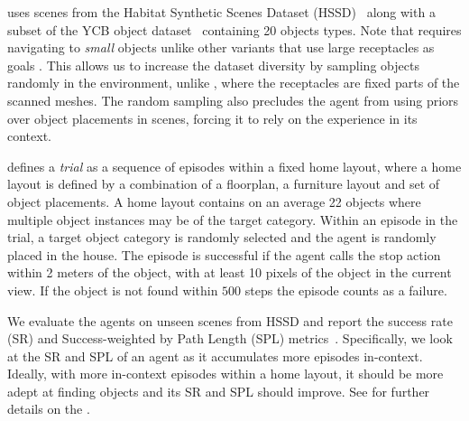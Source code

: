 \task uses scenes from the Habitat Synthetic Scenes Dataset (HSSD)~\citep{khanna2023habitat} along with a subset of the YCB object dataset~\citep{calli2015ycb} containing 20 objects types. 
Note that \task requires navigating to \emph{small} objects unlike other \obnav variants that use large receptacles as goals \citep{habitat-challenge-2021}. This allows us to increase the dataset diversity by sampling objects randomly in the environment, unlike \obnav, where the receptacles are fixed parts of the scanned meshes. The random sampling also precludes the agent from using priors over object placements in scenes, forcing it to rely on the experience in its context.

\task defines a \emph{trial} as a sequence of episodes within a fixed home layout, where a home layout is defined by a combination of a floorplan, a furniture layout and set of object placements. A home layout contains on an average 22 objects where multiple object instances may be of the target category. Within an episode in the trial, a target object category is randomly selected and the agent is randomly placed in the house. The episode is successful if the agent calls the stop action within 2 meters of the object, with at least 10 pixels of the object in the current view. If the object is not found within $500$ steps the episode counts as a failure.

We evaluate the agents on unseen scenes from HSSD and report the success rate (SR) and Success-weighted by Path Length (SPL) metrics~\citep{anderson2018evaluation}. Specifically, we look at the SR and SPL of an agent as it accumulates more episodes in-context. Ideally, with more in-context episodes within a home layout, it should be more adept at finding objects and its SR and SPL should improve. See  for further details on the \task.

